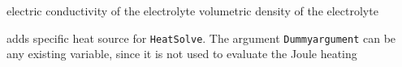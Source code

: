    \sifbegin
     electric conductivity of the electrolyte
     volumetric density of the electrolyte
   \sifend

   \sifbegin
     adds specific heat source for \texttt{HeatSolve}.  
     The argument \texttt{Dummyargument} can be any existing variable, since it is not used to evaluate the Joule heating	
   \sifend
\sifend






